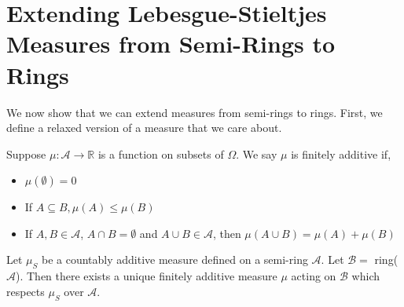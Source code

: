 \section{Extending Lebesgue-Stieltjes Measures from Semi-Rings to Rings}

We now show that we can extend measures from semi-rings to rings. First, we define a 
relaxed version of a measure that we care about. 

\begin{definition}
   Suppose $\mu : \mathcal A \to \mathbb R$ is a function on subsets of 
   $\Omega$. We say $\mu$ is finitely additive if,
   \begin{itemize}
      \item $\mu(\emptyset) = 0$
      \item If $A \subseteq B, \mu(A) \leq \mu(B)$
      \item If $A,B \in \mathcal A$, $A \cap B = \emptyset$ and $A \cup B \in \mathcal A$, then $\mu(A \cup B) = \mu(A) + \mu(B)$
   \end{itemize}
\end{definition}

\begin{theorem}
   Let $\mu_S$ be a countably additive measure defined on a semi-ring $\mathcal A$. Let 
   $\mathcal B = $ ring($\mathcal A$). Then there exists a unique finitely additive measure 
   $\mu$ acting on $\mathcal B$ which respects $\mu_S$ over $\mathcal A$.
\end{theorem}


